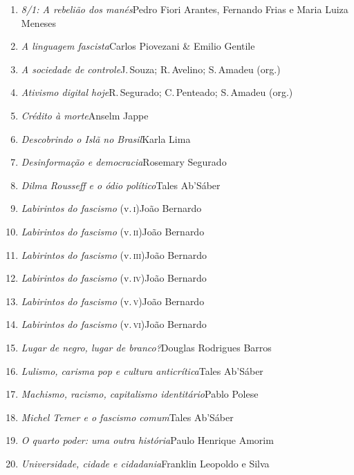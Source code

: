 \medskip
{}

\begin{enumerate}
\setlength\parskip{4.2pt}
\setlength\itemsep{-1.4mm}
\item \textit{8/1: A rebelião dos manés}\quad Pedro Fiori Arantes, Fernando Frias e Maria Luiza Meneses
\item \textit{A linguagem fascista}\quad Carlos Piovezani \& Emilio Gentile
\item \textit{A sociedade de controle}\quad J.\,Souza; R.\,Avelino; S.\,Amadeu (org.)
\item \textit{Ativismo digital hoje}\quad R.\,Segurado; C.\,Penteado; S.\,Amadeu (org.)
\item \textit{Crédito à morte}\quad Anselm Jappe
\item \textit{Descobrindo o Islã no Brasil}\quad Karla Lima
\item \textit{Desinformação e democracia}\quad Rosemary Segurado
\item \textit{Dilma Rousseff e o ódio político}\quad Tales Ab'Sáber
\item \textit{Labirintos do fascismo} (v.\,\textsc{i})\quad João Bernardo
\item \textit{Labirintos do fascismo} (v.\,\textsc{ii})\quad João Bernardo
\item \textit{Labirintos do fascismo} (v.\,\textsc{iii})\quad João Bernardo
\item \textit{Labirintos do fascismo} (v.\,\textsc{iv})\quad João Bernardo
\item \textit{Labirintos do fascismo} (v.\,\textsc{v})\quad João Bernardo
\item \textit{Labirintos do fascismo} (v.\,\textsc{vi})\quad João Bernardo
\item \textit{Lugar de negro, lugar de branco?}\quad Douglas Rodrigues Barros
\item \textit{Lulismo, carisma pop e cultura anticrítica}\quad Tales Ab'Sáber
\item \textit{Machismo, racismo, capitalismo identitário}\quad Pablo Polese
\item \textit{Michel Temer e o fascismo comum}\quad Tales Ab'Sáber
\item \textit{O quarto poder: uma outra história}\quad Paulo Henrique Amorim
\item \textit{Universidade, cidade e cidadania}\quad Franklin Leopoldo e Silva
\end{enumerate}

